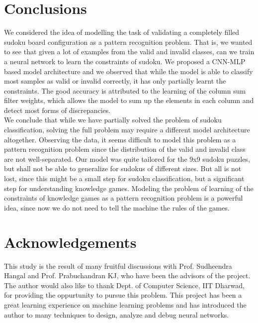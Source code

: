 \documentclass[twoside]{article}
\begin{document}
\section{Conclusions}
We considered the idea of modelling the task of validating a completely filled sudoku board configuration as a pattern recognition problem. That is, we wanted to see that given a lot of examples from the valid and invalid classes, can we train a neural network to learn the constraints of sudoku. We proposed a CNN-MLP based model architecture and we observed that while the model is able to classify most samples as valid or invalid correctly, it has only partially learnt the constraints. The good accuracy is attributed to the learning of the column sum filter weights, which allows the model to sum up the elements in each column and detect most forms of discrepancies.\\

We conclude that while we have partially solved the problem of sudoku classification, solving the full problem may require a different model architecture altogether. Observing the data, it seems difficult to model this problem as a pattern recognition problem since the distribution of the valid and invalid class are not well-separated. Our model was quite tailored for the 9x9 sudoku puzzles, but shall not be able to generalize for sudokus of different sizes. But all is not lost, since this might be a small step for sudoku classification, but a significant step for understanding knowledge games. Modeling the problem of learning of the constraints of knowledge games as a pattern recognition problem is a powerful idea, since now we do not need to tell the machine the rules of the games.
\section{Acknowledgements}
This study is the result of many fruitful discussions with Prof. Sudheendra Hangal and Prof. Prabuchandran KJ, who have been the advisors of the project. The author would also like to thank Dept. of Computer Science, IIT Dharwad, for providing the oppurtunity to pursue this problem. This project has been a great learning experience on machine learning problems and has introduced the author to many techniques to design, analyze and debug neural networks.
\end{document}
